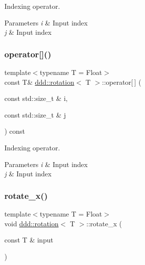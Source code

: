 Indexing operator. 


\begin{DoxyParams}{Parameters}
{\em i} & Input index \\
\hline
{\em j} & Input index \\
\hline
\end{DoxyParams}
\mbox{\label{classddd_1_1rotation_abe1b800d2857b75ad2d00de4743bfa85}} 
\subsubsection{\texorpdfstring{operator[]()}{operator[]()}\hspace{0.1cm}{\footnotesize\ttfamily [2/2]}}
{\footnotesize\ttfamily template$<$typename T  = Float$>$ \\
const T\& \hyperlink{classddd_1_1rotation}{ddd\+::rotation}$<$ T $>$\+::operator\mbox{[}$\,$\mbox{]} (\begin{DoxyParamCaption}\item[{const std\+::size\+\_\+t \&}]{i,  }\item[{const std\+::size\+\_\+t \&}]{j }\end{DoxyParamCaption}) const\hspace{0.3cm}{\ttfamily [inline]}}



Indexing operator. 


\begin{DoxyParams}{Parameters}
{\em i} & Input index \\
\hline
{\em j} & Input index \\
\hline
\end{DoxyParams}
\mbox{\label{classddd_1_1rotation_af4bd213ca0cf7d372f840cbfd9d37696}} 
\subsubsection{\texorpdfstring{rotate\+\_\+x()}{rotate\_x()}}
{\footnotesize\ttfamily template$<$typename T  = Float$>$ \\
void \hyperlink{classddd_1_1rotation}{ddd\+::rotation}$<$ T $>$\+::rotate\+\_\+x (\begin{DoxyParamCaption}\item[{const T \&}]{input }\end{DoxyParamCaption})\hspace{0.3cm}{\ttfamily [inline]}}



